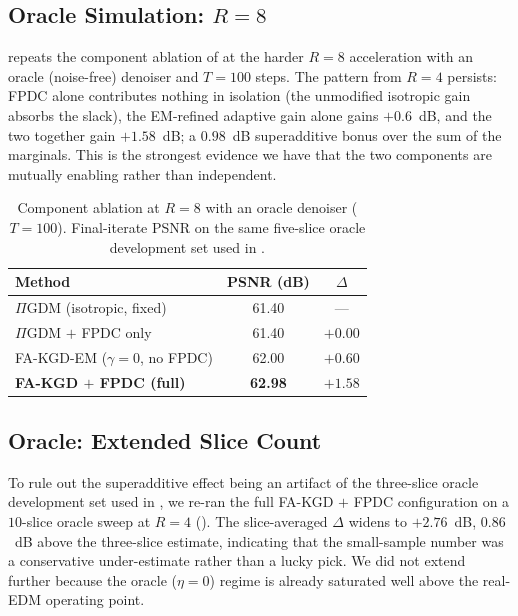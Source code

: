 \documentclass[10pt,twocolumn,letterpaper]{article}
\begin{document}
\subsection{Oracle Simulation: \texorpdfstring{$R{=}8$}{R=8}}

 repeats the component ablation of 
at the harder $R{=}8$ acceleration with an oracle (noise-free) denoiser
and $T{=}100$ steps. The pattern from $R{=}4$ persists: FPDC alone
contributes nothing in isolation (the unmodified isotropic gain absorbs
the slack), the EM-refined adaptive gain alone gains $+0.6$~dB, and the
two together gain $+1.58$~dB; a $0.98$~dB superadditive bonus over the
sum of the marginals. This is the strongest evidence we have that the
two components are mutually enabling rather than independent.

\begin{table}[h]
\centering
\caption{Component ablation at $R{=}8$ with an oracle denoiser
($T{=}100$). Final-iterate PSNR on the same five-slice oracle development set
used in .}
\label{tab:r8}
\begin{tabular}{lcc}
\toprule
\textbf{Method} & \textbf{PSNR (dB)} & \textbf{$\Delta$} \\
\midrule
$\Pi$GDM (isotropic, fixed)            & 61.40 & --- \\
$\Pi$GDM $+$ FPDC only                 & 61.40 & $+0.00$ \\
FA-KGD-EM ($\gamma{=}0$, no FPDC)      & 62.00 & $+0.60$ \\
\textbf{FA-KGD $+$ FPDC (full)}        & \textbf{62.98} & $\mathbf{+1.58}$ \\
\bottomrule
\end{tabular}
\end{table}

\subsection{Oracle: Extended Slice Count}

To rule out the superadditive effect being an artifact of the
three-slice oracle development set used in , we
re-ran the full FA-KGD $+$ FPDC configuration on a $10$-slice oracle
sweep at $R{=}4$ (). The slice-averaged
$\Delta$ widens to $+2.76$~dB, $0.86$~dB above the three-slice
estimate, indicating that the small-sample number was a conservative
under-estimate rather than a lucky pick. We did not extend further
because the oracle ($\eta{=}0$) regime is already saturated well above
the real-EDM operating point.
\end{document}
